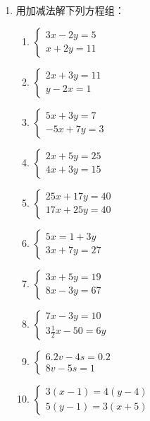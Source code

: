 \begin{enumerate}
\item 用加减法解下列方程组：
\begin{multicols}{2}
    \begin{enumerate}
        \item $\begin{cases}
            3x-2y=5\\ x+2y=11
        \end{cases}$
        \item $\begin{cases}
           2x+3y=11\\ y-2x=1 
        \end{cases}$
        \item $\begin{cases}
            5x+3y=7\\-5x+7y=3
        \end{cases}$
        \item $\begin{cases}
            2x+5y=25\\4x+3y=15
        \end{cases}$
        \item $\begin{cases}
            25x+17y=40\\17x+25y=40
        \end{cases}$
        \item $\begin{cases}
            5x=1+3y\\3x+7y=27
        \end{cases}$
        \item $\begin{cases}
            3x+5y=19\\ 8x-3y=67
        \end{cases}$
        \item $\begin{cases}
            7x-3y=10\\  3\frac{1}{2}x-50=6y
        \end{cases}$
        \item $\begin{cases}
            6.2v-4s=0.2\\ 8v-5s=1
        \end{cases}$
        \item $\begin{cases}
            3(x-1)=4(y-4)\\5(y-1)=3(x+5)
        \end{cases}$

\end{enumerate}
\end{multicols}
\end{enumerate}
